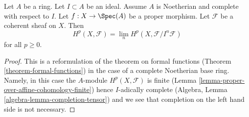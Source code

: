 \begin{lemma}
\label{lemma-spell-out-theorem-formal-functions}
Let $A$ be a ring. Let $I \subset A$ be an ideal. Assume $A$ is
Noetherian and complete with respect to $I$.
Let $f : X \to \Spec(A)$ be a proper morphism.
Let $\mathcal{F}$ be a coherent sheaf on $X$.
Then
$$
H^p(X, \mathcal{F}) = \lim_n H^p(X, \mathcal{F}/I^n\mathcal{F})
$$
for all $p \geq 0$.
\end{lemma}

\begin{proof}
This is a reformulation of the theorem on formal functions
(Theorem \ref{theorem-formal-functions}) in the
case of a complete Noetherian base ring. Namely, in this case the
$A$-module $H^p(X, \mathcal{F})$ is finite
(Lemma \ref{lemma-proper-over-affine-cohomology-finite}) hence
$I$-adically complete (Algebra, Lemma \ref{algebra-lemma-completion-tensor})
and we see that completion on the left hand side is not necessary.
\end{proof}
